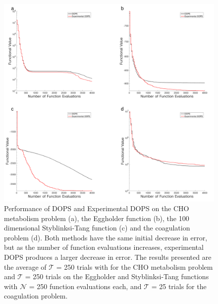 \documentclass{bmcart}
\begin{document}
\begin{backmatter}
\begin{figure}[h!]
\includegraphics[width = 1.0\textwidth]{./rachelfigs/expDOPSvsDOPS-crop.pdf}
\caption{ Performance of DOPS and Experimental DOPS on the CHO metabolism problem (a), the Eggholder function (b), the 100 dimensional Styblinksi-Tang function (c) and the coagulation problem (d). Both methods have the same initial decrease in error, but as the number of function evaluations increases, experimental DOPS produces a larger decrease in error.
The results presented are the average of $\mathcal{T}$ = 250 trials with for the CHO metabolism problem and $\mathcal{T}$ = 250 trials on the Eggholder and Styblinksi-Tang functions with $\mathcal{N}$ = 250 function evaluations each, and $\mathcal{T}$ = 25 trials for the coagulation problem.
}\label{fig-exp-DOPS-b4}
\end{figure}

\clearpage



\end{backmatter}
\end{document}
